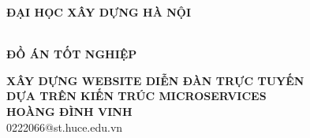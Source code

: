 \documentclass[../index.tex]{subfiles}
\begin{document}
  \begin{titlepage}
    \thispagestyle{empty}
    \begin{center}
      {\textbf{\large{ĐẠI HỌC XÂY DỰNG HÀ NỘI}}}\\[4cm] \

      {\textbf{\huge{ĐỒ ÁN TỐT NGHIỆP}}}\\[1cm] {\textbf{\large{XÂY DỰNG WEBSITE DIỄN ĐÀN TRỰC TUYẾN\\DỰA TRÊN KIẾN TRÚC MICROSERVICES}}\\[1cm] {\textbf{\large{HOÀNG ĐÌNH VINH}}}\\ {\large{0222066@st.huce.edu.vn}}\\[0.5cm] \vspace{2cm} \begin{table}[H]\centering {}\end{table}}
    \end{center}
  \end{titlepage}
\end{document}
